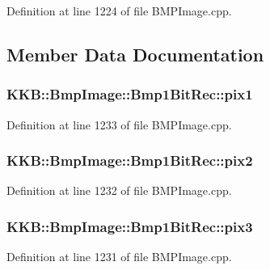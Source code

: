 Definition at line 1224 of file B\+M\+P\+Image.\+cpp.



\subsection{Member Data Documentation}
\subsubsection[{\texorpdfstring{pix1}{pix1}}]{ K\+K\+B\+::\+Bmp\+Image\+::\+Bmp1\+Bit\+Rec\+::pix1}\hypertarget{struct_bmp_image_1_1_bmp1_bit_rec_a020ecd277582b93667bef4fac216b33e}{}\label{struct_bmp_image_1_1_bmp1_bit_rec_a020ecd277582b93667bef4fac216b33e}


Definition at line 1233 of file B\+M\+P\+Image.\+cpp.

\subsubsection[{\texorpdfstring{pix2}{pix2}}]{ K\+K\+B\+::\+Bmp\+Image\+::\+Bmp1\+Bit\+Rec\+::pix2}\hypertarget{struct_bmp_image_1_1_bmp1_bit_rec_acec752ead4a988c1889780019c061b06}{}\label{struct_bmp_image_1_1_bmp1_bit_rec_acec752ead4a988c1889780019c061b06}


Definition at line 1232 of file B\+M\+P\+Image.\+cpp.

\subsubsection[{\texorpdfstring{pix3}{pix3}}]{ K\+K\+B\+::\+Bmp\+Image\+::\+Bmp1\+Bit\+Rec\+::pix3}\hypertarget{struct_bmp_image_1_1_bmp1_bit_rec_a274d26e06f64d5e3351bef71233c79e6}{}\label{struct_bmp_image_1_1_bmp1_bit_rec_a274d26e06f64d5e3351bef71233c79e6}


Definition at line 1231 of file B\+M\+P\+Image.\+cpp.

